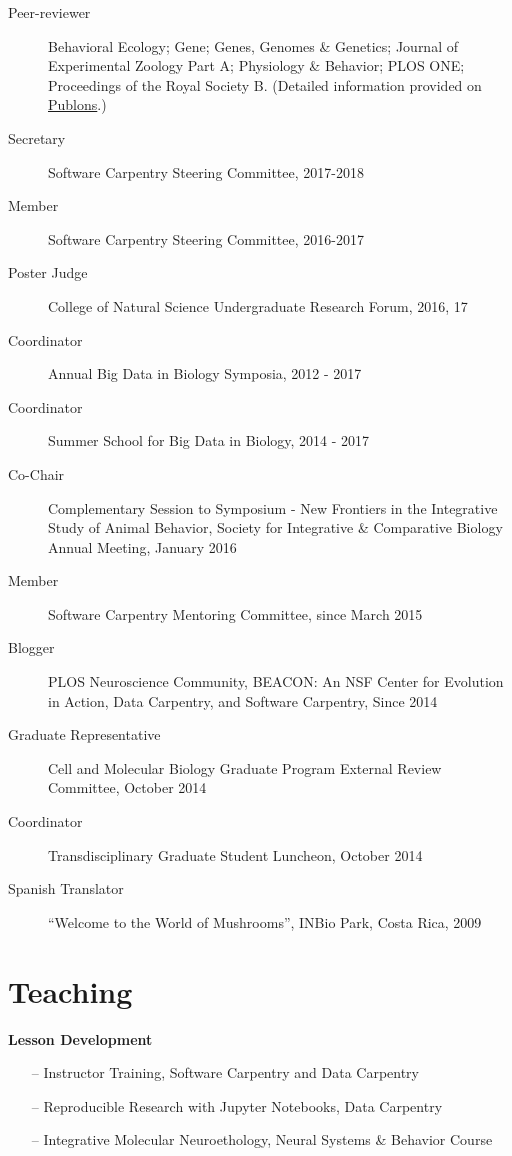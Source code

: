 \documentclass[margin,line]{resume}
\begin{document}
\begin{resume}
\begin{description}
\item[Peer-reviewer] Behavioral Ecology; Gene; Genes, Genomes \& Genetics; Journal of Experimental Zoology Part A; Physiology \& Behavior; PLOS ONE; Proceedings of the Royal Society B. (Detailed information provided on \href{https://publons.com/author/444397/rayna-harris#profile}{Publons}.) 
\item[Secretary] Software Carpentry Steering Committee, 2017-2018
\item[Member] Software Carpentry Steering Committee, 2016-2017
\item[Poster Judge] College of Natural Science Undergraduate Research Forum, 2016, 17
\item[Coordinator] Annual Big Data in Biology Symposia, 2012 - 2017 
\item[Coordinator] Summer School for Big Data in Biology, 2014 - 2017
\item[Co-Chair] Complementary Session to Symposium - New Frontiers in the Integrative Study of Animal Behavior, Society for Integrative \& Comparative Biology Annual Meeting, January 2016
\item[Member] Software Carpentry Mentoring Committee, since March 2015
\item[Blogger] PLOS Neuroscience Community, BEACON: An NSF Center for Evolution in Action, Data Carpentry, and Software Carpentry, Since 2014
\item[Graduate Representative] Cell and Molecular Biology Graduate Program External Review Committee, October 2014 
\item[Coordinator] Transdisciplinary Graduate Student Luncheon, October 2014
\item[Spanish Translator] “Welcome to the World of Mushrooms”, INBio Park, Costa Rica, 2009
\end{description}

    
\section{\mysidestyle Teaching}
{\bf Lesson Development}
\begin{itemize}
\raggedright
\item[--] Instructor Training, Software Carpentry and Data Carpentry
\item[--] Reproducible Research with Jupyter Notebooks, Data Carpentry
\item[--] Integrative Molecular Neuroethology, Neural Systems \& Behavior Course 


\end{itemize}
\end{resume}
\end{document}
